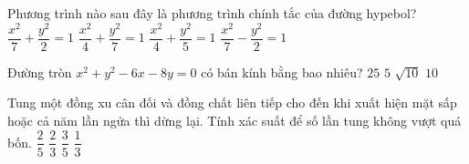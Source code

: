 \begin{ex}%
	Phương trình nào sau đây là phương trình chính tắc của đường hypebol?
	\choice
	{$\dfrac{x^2}{7}+\dfrac{y^2}{2}=1$}
	{$\dfrac{x^2}{4}+\dfrac{y^2}{7}=1$}
	{$\dfrac{x^2}{4}+\dfrac{y^2}{5}=1$}
	{\True $\dfrac{x^2}{7}-\dfrac{y^2}{2}=1$}
\end{ex}

\begin{ex}%
	Đường tròn $x^2+y^2-6 x-8 y=0$ có bán kính bằng bao nhiêu?
	\choice
	{$ 25  $}
	{\True $ 5  $}
	{$\sqrt{10}$}
	{$ 10 $}
\end{ex}

\begin{ex}%
	Tung một đồng xu cân đối và đồng chất liên tiếp cho đến khi xuất hiện mặt sấp hoặc cả năm lần ngửa thì dừng lại. Tính xác suất để số lần tung không vượt quá bốn.
	\choice
	{$\dfrac{2}{5}$}
	{\True  $\dfrac{2}{3}$}
	{$\dfrac{3}{5}$}
	{$\dfrac{1}{3}$}
\end{ex}

